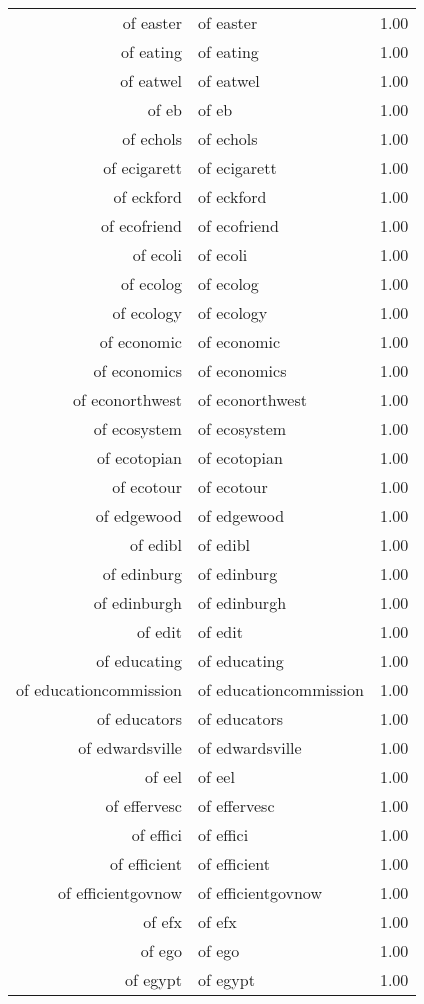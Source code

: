 \begin{table}[ht]
\begin{tabular}{rlr}
  of easter & of easter & 1.00 \\ 
  of eating & of eating & 1.00 \\ 
  of eatwel & of eatwel & 1.00 \\ 
  of eb & of eb & 1.00 \\ 
  of echols & of echols & 1.00 \\ 
  of ecigarett & of ecigarett & 1.00 \\ 
  of eckford & of eckford & 1.00 \\ 
  of ecofriend & of ecofriend & 1.00 \\ 
  of ecoli & of ecoli & 1.00 \\ 
  of ecolog & of ecolog & 1.00 \\ 
  of ecology & of ecology & 1.00 \\ 
  of economic & of economic & 1.00 \\ 
  of economics & of economics & 1.00 \\ 
  of econorthwest & of econorthwest & 1.00 \\ 
  of ecosystem & of ecosystem & 1.00 \\ 
  of ecotopian & of ecotopian & 1.00 \\ 
  of ecotour & of ecotour & 1.00 \\ 
  of edgewood & of edgewood & 1.00 \\ 
  of edibl & of edibl & 1.00 \\ 
  of edinburg & of edinburg & 1.00 \\ 
  of edinburgh & of edinburgh & 1.00 \\ 
  of edit & of edit & 1.00 \\ 
  of educating & of educating & 1.00 \\ 
  of educationcommission & of educationcommission & 1.00 \\ 
  of educators & of educators & 1.00 \\ 
  of edwardsville & of edwardsville & 1.00 \\ 
  of eel & of eel & 1.00 \\ 
  of effervesc & of effervesc & 1.00 \\ 
  of effici & of effici & 1.00 \\ 
  of efficient & of efficient & 1.00 \\ 
  of efficientgovnow & of efficientgovnow & 1.00 \\ 
  of efx & of efx & 1.00 \\ 
  of ego & of ego & 1.00 \\ 
  of egypt & of egypt & 1.00 \\ 

\end{tabular}
\end{table}
